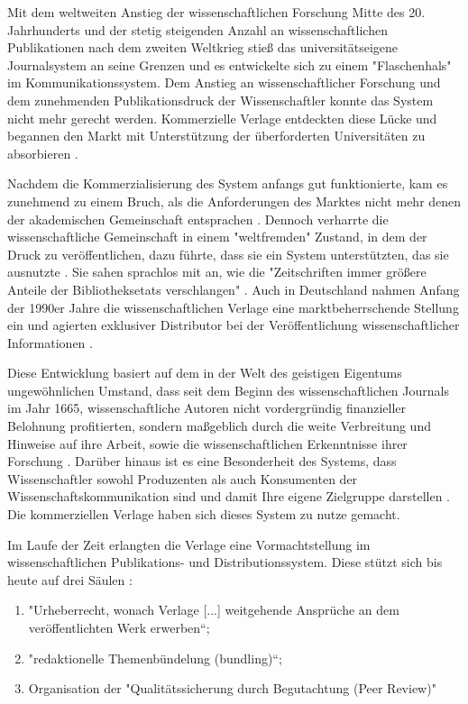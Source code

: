 Mit dem weltweiten Anstieg der wissenschaftlichen Forschung Mitte des 20. Jahrhunderts und der stetig steigenden Anzahl an wissenschaftlichen Publikationen nach dem zweiten Weltkrieg stieß das universitätseigene Journalsystem an seine Grenzen und es entwickelte sich zu einem "Flaschenhals" \cite{epaa_Weiner_2001} im Kommunikationssystem. Dem Anstieg an wissenschaftlicher Forschung und dem zunehmenden Publikationsdruck der Wissenschaftler konnte das System nicht mehr gerecht werden. Kommerzielle Verlage entdeckten diese Lücke und begannen den Markt mit Unterstützung der überforderten Universitäten zu absorbieren \cite{suchen}.

Nachdem die Kommerzialisierung des System anfangs gut funktionierte, kam es zunehmend zu einem Bruch, als die Anforderungen des Marktes nicht mehr denen der akademischen Gemeinschaft entsprachen \cite{epaa_Weiner_2001}. Dennoch verharrte die wissenschaftliche Gemeinschaft in einem "weltfremden" Zustand, in dem der Druck zu veröffentlichen, dazu führte, dass sie ein System unterstützten, das sie ausnutzte \cite{epaa_Weiner_2001}. Sie sahen sprachlos mit an, wie die "Zeitschriften immer größere Anteile der Bibliotheksetats verschlangen" \cite{hagner_2015_sache_buches}. Auch in Deutschland nahmen Anfang der 1990er Jahre die wissenschaftlichen Verlage eine marktbeherrschende Stellung ein und agierten exklusiver Distributor bei der Veröffentlichung wissenschaftlicher Informationen \cite{schloegl_2005} \cite{offhaus_2012_institutionelle_repos}.

Diese Entwicklung basiert auf dem in der Welt des geistigen Eigentums ungewöhnlichen Umstand, dass seit dem Beginn des wissenschaftlichen Journals im Jahr 1665, wissenschaftliche Autoren nicht vordergründig finanzieller Belohnung profitierten, sondern maßgeblich durch die weite Verbreitung und Hinweise auf ihre Arbeit, sowie die wissenschaftlichen Erkenntnisse ihrer Forschung \cite{albert_2006_open_implications}. Darüber hinaus ist es eine Besonderheit des Systems, dass Wissenschaftler sowohl Produzenten als auch Konsumenten der Wissenschaftskommunikation sind und damit Ihre eigene Zielgruppe darstellen \cite{Hess_2006}. Die kommerziellen Verlage haben sich dieses System zu nutze gemacht.

Im Laufe der Zeit erlangten die Verlage eine Vormachtstellung im wissenschaftlichen Publikations- und Distributionssystem. Diese stützt sich bis heute auf drei Säulen \cite{offhaus_2012_institutionelle_repos} \cite{bargheer_2006_open}:
\begin{enumerate}
\item "Urheberrecht, wonach Verlage [...] weitgehende Ansprüche an dem veröffentlichten Werk erwerben“;
\item "redaktionelle Themenbündelung (bundling)“;
\item Organisation der "Qualitätssicherung durch Begutachtung (Peer Review)"
\end{enumerate}

